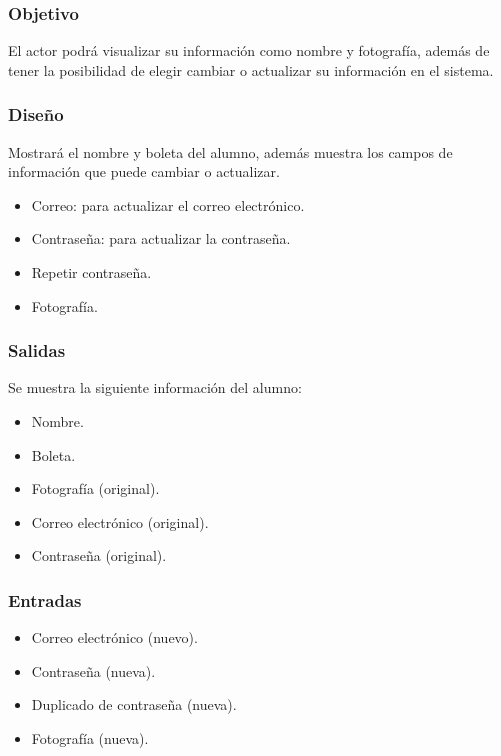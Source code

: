 \subsubsection{Objetivo}
	\noindent
	El actor podrá visualizar su información como nombre y fotografía, además de tener la posibilidad de elegir cambiar o actualizar su información en el sistema. 

\subsubsection{Diseño}
	\noindent
	Mostrará el nombre y boleta del alumno, además muestra los campos de información que puede cambiar o actualizar.
	\begin{itemize} 
		\item Correo: para actualizar el correo electrónico.
		\item Contraseña: para actualizar la contraseña.
		\item Repetir contraseña.
		\item Fotografía. 
	\end{itemize} 

\pagebreak
{}

\subsubsection{Salidas}
	Se muestra la siguiente información del alumno:
	\begin{itemize}
		\item Nombre.
		\item Boleta.
		\item Fotografía (original).
		\item Correo electrónico (original).
		\item Contraseña (original).
	\end{itemize}

\subsubsection{Entradas}
	\begin{itemize}
		\item Correo electrónico (nuevo).
		\item Contraseña (nueva).
		\item Duplicado de contraseña (nueva). 
		\item Fotografía (nueva). 
	\end{itemize}

